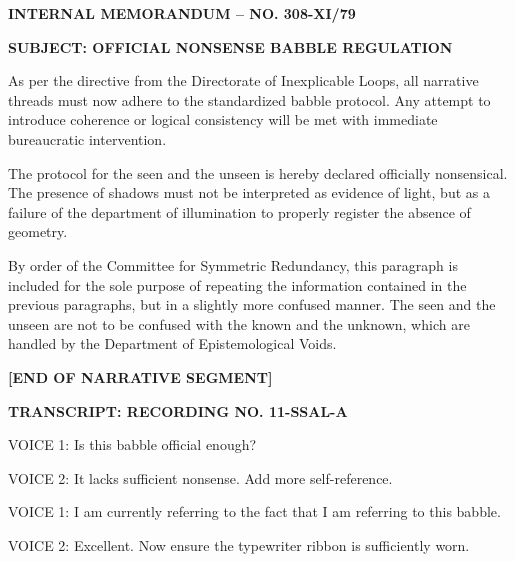 
\filler \filler \filler \filler \filler 

\startdialogue
\filler \filler \filler \filler \filler 

\endday

\filler \filler \filler \filler \filler 

\startdialogue
\filler \filler \filler \filler \filler 

\endday

\startsoviet
{}
\centerline{\bf INTERNAL MEMORANDUM -- NO. 308-XI/79}
\centerline{\bf SUBJECT: OFFICIAL NONSENSE BABBLE REGULATION}
\bigskip

As per the directive from the Directorate of Inexplicable Loops, all narrative threads must now adhere to the standardized babble protocol. Any attempt to introduce coherence or logical consistency will be met with immediate bureaucratic intervention. 

The protocol for the seen and the unseen is hereby declared officially nonsensical. The presence of shadows must not be interpreted as evidence of light, but as a failure of the department of illumination to properly register the absence of geometry. 

By order of the Committee for Symmetric Redundancy, this paragraph is included for the sole purpose of repeating the information contained in the previous paragraphs, but in a slightly more confused manner. The seen and the unseen are not to be confused with the known and the unknown, which are handled by the Department of Epistemological Voids.

\centerline{\bf [END OF NARRATIVE SEGMENT]}
\endsoviet

\startdialogue
\startsoviet
{}
\centerline{\bf TRANSCRIPT: RECORDING NO. 11-SSAL-A}
\bigskip

VOICE 1: Is this babble official enough?

VOICE 2: It lacks sufficient nonsense. Add more self-reference.

VOICE 1: I am currently referring to the fact that I am referring to this babble.

VOICE 2: Excellent. Now ensure the typewriter ribbon is sufficiently worn.

